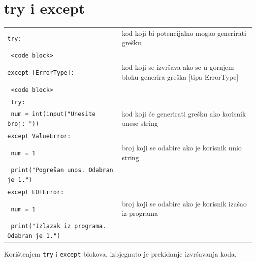 \documentclass[10pt]{article}
\begin{document}
    \section*{\color{NavyBlue} try i except}
    \begin{tabular}{|>{\tt}p{9.00cm}|>{}p{15.50cm}|}
        \hline
        try: & kod koji bi potencijalno mogao generirati grešku 
        \\
        \hspace{5mm} {<code block>} & 
        \\
        except [ErrorType]: & kod koji se izvršava ako se u gornjem bloku generira greška [tipa ErrorType]
        \\
        \hspace{5mm} {<code block>} & 
        \\ \hline
        \hline
        try: &
        \\
        \hspace{5mm} num = int(input("Unesite broj: ")) & kod koji će generirati grešku ako korisnik unese string
        \\
        except ValueError: &
        \\
        \hspace{5mm} num = 1 & broj koji se odabire ako je korisnik unio string
        \\
        \hspace{5mm} print("Pogrešan unos. Odabran je 1.")
        \\
        except EOFError: &
        \\
        \hspace{5mm} num = 1 & broj koji se odabire ako je korisnik izašao iz programa
        \\
        \hspace{5mm} print("Izlazak iz programa. Odabran je 1.")
        \\ \hline
    \end{tabular}
    \begin{center}
        Korištenjem \texttt{try} i \texttt{except} blokova, izbjegnuto je prekidanje izvršavanja koda. 
    \end{center}
\end{document}
